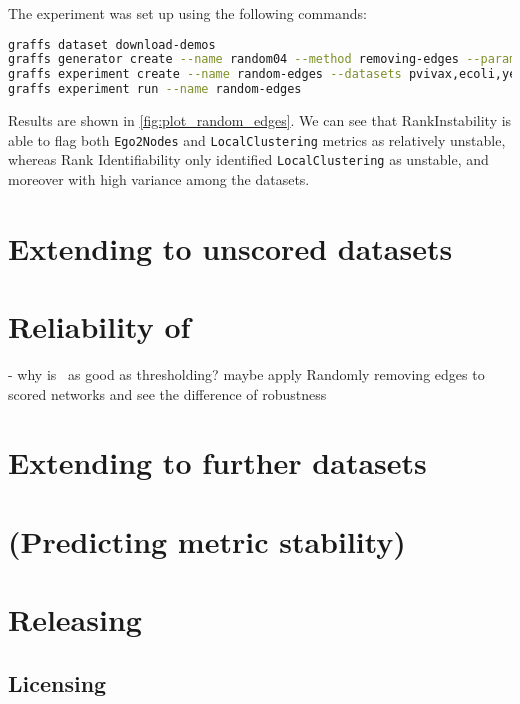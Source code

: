 The experiment was set up using the following commands:
\begin{lstlisting}[language=bash]
graffs dataset download-demos
graffs generator create --name random04 --method removing-edges --params 0.04,600 -n 31 --seed 7
graffs experiment create --name random-edges --datasets pvivax,ecoli,yeast --generator random04 --metrics Betweenness,Degree,Ego1Edges,Ego2Nodes,LocalClustering,PageRank,Redundancy --robustnessMeasures RankIdentifiability,RankInstability
graffs experiment run --name random-edges
\end{lstlisting}



Results are shown in \autoref{fig:plot_random_edges}.
We can see that RankInstability is able to flag both \texttt{Ego2Nodes} and \texttt{LocalClustering} metrics as relatively unstable, whereas Rank Identifiability only identified \texttt{LocalClustering} as unstable, and moreover with high variance among the datasets.



\section{Extending to unscored datasets}

\section{Reliability of \graffs}

- why is~ as good as thresholding?
maybe apply Randomly removing edges to scored networks and see the difference of robustness




\section{Extending to further datasets}


\section{(Predicting metric stability)}


\section{Releasing \graffs}

\subsection{Licensing}
